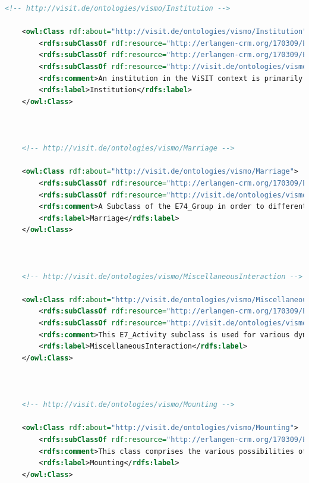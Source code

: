\begin{lstlisting}[caption={VisMo Ontologie in der letzten (englischen) Version.},label={lst:vismo},captionpos=b,language=xml]
    <!-- http://visit.de/ontologies/vismo/Institution -->

    <owl:Class rdf:about="http://visit.de/ontologies/vismo/Institution">
        <rdfs:subClassOf rdf:resource="http://erlangen-crm.org/170309/E53_Place"/>
        <rdfs:subClassOf rdf:resource="http://erlangen-crm.org/170309/E74_Group"/>
        <rdfs:subClassOf rdf:resource="http://visit.de/ontologies/vismo/Resource"/>
        <rdfs:comment>An institution in the ViSIT context is primarily used for museums, which inherit both the properties of a E53_Place as well as a E74_Group. This is necessary to make instances of this class be able to represent a spatial entity as well as an entity that can for example hold vismo:Objects.</rdfs:comment>
        <rdfs:label>Institution</rdfs:label>
    </owl:Class>
    


    <!-- http://visit.de/ontologies/vismo/Marriage -->

    <owl:Class rdf:about="http://visit.de/ontologies/vismo/Marriage">
        <rdfs:subClassOf rdf:resource="http://erlangen-crm.org/170309/E74_Group"/>
        <rdfs:subClassOf rdf:resource="http://visit.de/ontologies/vismo/Resource"/>
        <rdfs:comment>A Subclass of the E74_Group in order to differentiate the participation of a vismo:Person in a Marriage rather than any other vismo:Group.</rdfs:comment>
        <rdfs:label>Marriage</rdfs:label>
    </owl:Class>
    


    <!-- http://visit.de/ontologies/vismo/MiscellaneousInteraction -->

    <owl:Class rdf:about="http://visit.de/ontologies/vismo/MiscellaneousInteraction">
        <rdfs:subClassOf rdf:resource="http://erlangen-crm.org/170309/E7_Activity"/>
        <rdfs:subClassOf rdf:resource="http://visit.de/ontologies/vismo/Resource"/>
        <rdfs:comment>This E7_Activity subclass is used for various dynamic interactions between vismo:Resource objects, whose interaction is not yet known or more specifically not defined by the ontology model.</rdfs:comment>
        <rdfs:label>MiscellaneousInteraction</rdfs:label>
    </owl:Class>
    


    <!-- http://visit.de/ontologies/vismo/Mounting -->

    <owl:Class rdf:about="http://visit.de/ontologies/vismo/Mounting">
        <rdfs:subClassOf rdf:resource="http://erlangen-crm.org/170309/E55_Type"/>
        <rdfs:comment>This class comprises the various possibilities of fix/mount/place an Inscription onto a vismo:Object.</rdfs:comment>
        <rdfs:label>Mounting</rdfs:label>
    </owl:Class>
    



\end{lstlisting}

